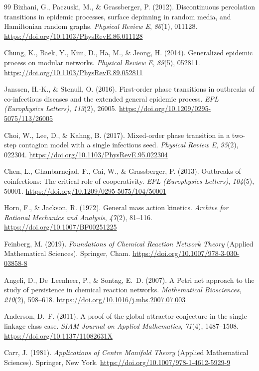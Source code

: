 \documentclass[11pt,a4paper]{article}
\theoremstyle{definition}\newtheorem{definition}[theorem]{Definition}
\theoremstyle{remark}\newtheorem{remark}[theorem]{Remark}
\begin{document}
\begin{thebibliography}{99}
Bizhani, G., Paczuski, M., \& Grassberger, P. (2012).
Discontinuous percolation transitions in epidemic processes, surface depinning in random media, and Hamiltonian random graphs.
\emph{Physical Review E}, \emph{86}(1), 011128.
\url{https://doi.org/10.1103/PhysRevE.86.011128}

Chung, K., Baek, Y., Kim, D., Ha, M., \& Jeong, H. (2014).
Generalized epidemic process on modular networks.
\emph{Physical Review E}, \emph{89}(5), 052811.
\url{https://doi.org/10.1103/PhysRevE.89.052811}

Janssen, H.-K., \& Stenull, O. (2016).
First-order phase transitions in outbreaks of co-infectious diseases and the extended general epidemic process.
\emph{EPL (Europhysics Letters)}, \emph{113}(2), 26005.
\url{https://doi.org/10.1209/0295-5075/113/26005}

Choi, W., Lee, D., \& Kahng, B. (2017).
Mixed-order phase transition in a two-step contagion model with a single infectious seed.
\emph{Physical Review E}, \emph{95}(2), 022304.
\url{https://doi.org/10.1103/PhysRevE.95.022304}


Chen, L., Ghanbarnejad, F., Cai, W., \& Grassberger, P. (2013).
Outbreaks of coinfections: The critical role of cooperativity.
\emph{EPL (Europhysics Letters)}, \emph{104}(5), 50001.
\url{https://doi.org/10.1209/0295-5075/104/50001}

Horn, F., \& Jackson, R. (1972).
General mass action kinetics.
\emph{Archive for Rational Mechanics and Analysis}, \emph{47}(2), 81--116.
\url{https://doi.org/10.1007/BF00251225}

Feinberg, M. (2019).
\emph{Foundations of Chemical Reaction Network Theory} (Applied Mathematical Sciences).
Springer, Cham.
\url{https://doi.org/10.1007/978-3-030-03858-8}

Angeli, D., De~Leenheer, P., \& Sontag, E.~D. (2007).
A Petri net approach to the study of persistence in chemical reaction networks.
\emph{Mathematical Biosciences}, \emph{210}(2), 598--618.
\url{https://doi.org/10.1016/j.mbs.2007.07.003}

Anderson, D.~F. (2011).
A proof of the global attractor conjecture in the single linkage class case.
\emph{SIAM Journal on Applied Mathematics}, \emph{71}(4), 1487--1508.
\url{https://doi.org/10.1137/11082631X}


Carr, J. (1981).
\emph{Applications of Centre Manifold Theory} (Applied Mathematical Sciences).
Springer, New York.
\url{https://doi.org/10.1007/978-1-4612-5929-9}


\end{thebibliography}
\end{document}

